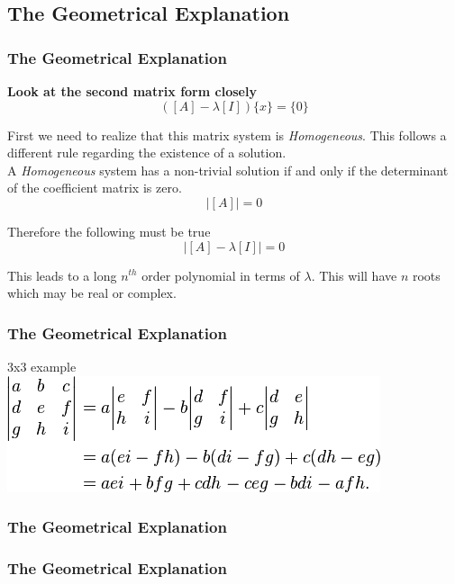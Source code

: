 \documentclass[fleqn]{beamer} %
\newcommand{\sectionIsubsectionIIItitle}{The Geometrical Explanation}
\begin{document}
		\subsection{\sectionIsubsectionIIItitle}\label{sectionIsubsectionIII}
			\begin{frame} 
				\frametitle{\sectionIsubsectionIIItitle} \small
				\bigskip

				\textbf{Look at the second matrix form closely}\\

				\[ ([A]-\lambda[I])\{x\}=\{0\} \]

				First we need to realize that this matrix system is {\it Homogeneous}. This follows a different rule regarding the existence of a solution.\\
				 A {\it Homogeneous} system has a non-trivial solution if and only if the determinant of the coefficient matrix is zero.\\

				\[ |[A]|=0 \]

				Therefore the following must be true\\
				\[ |[A]-\lambda[I]|=0 \]

				This leads to a long $n^{th}$ order polynomial in terms of $\lambda$. This will have $n$ roots which may be real or complex.

				\btVFill
			\end{frame}	

			\begin{frame} 
				\frametitle{\sectionIsubsectionIIItitle}
				\bigskip

				3x3 example \\
				\includegraphics[scale=.5]{images/lecture5_fig1.png}
	
				\btVFill
			\end{frame}	

			\begin{frame} 
				\frametitle{\sectionIsubsectionIIItitle}
				\bigskip


				\btVFill
			\end{frame}	

			\begin{frame} 
				\frametitle{\sectionIsubsectionIIItitle}
				\bigskip
	
				
				\btVFill
			\end{frame}	
\end{document}
